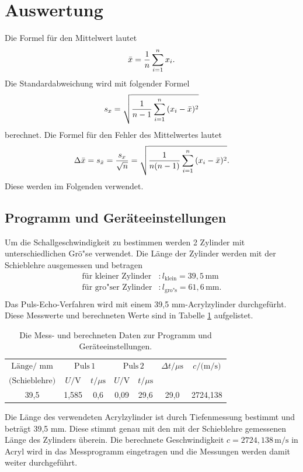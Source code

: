 \section{Auswertung}
\label{sec:Auswertung}
Die Formel für den Mittelwert lautet
 \begin{equation}
    \bar{x}=\frac{1}{n}\sum_{i=1}^n x_i.\\
\end{equation}
Die Standardabweichung wird mit folgender Formel
\begin{equation}
    s_x=\sqrt{\frac{1}{n-1}\sum_{i=1}^n {(x_i-\bar{x})^2 }}\\
\end{equation}
berechnet.
Die Formel für den Fehler des Mittelwertes lautet
\begin{equation}
    \Delta \bar{x} = s_{\bar{x}}=\frac{s_x}{\sqrt{n}}= \sqrt{\frac{1}{n(n-1)}\sum_{i=1}^n {(x_i-\bar{x})^2 }}.\\
\end{equation}
Diese werden im Folgenden verwendet.
\subsection{Programm und Geräteeinstellungen}
Um die Schallgeschwindigkeit zu bestimmen werden 2 Zylinder mit unterschiedlichen Grö"se verwendet. 
Die Länge der Zylinder werden mit der Schieblehre ausgemessen und betragen
\begin{align*}
    \text{für kleiner Zylinder}&: l_{\text{klein}} =39,5\, \text{mm}\\
    \text{für gro"ser Zylinder}&: l_{\text{gro"s}} =61,6\, \text{mm}.\\
   \end{align*}
Das Puls-Echo-Verfahren wird mit einem 39,5 mm-Acrylzylinder durchgefürht.
 Diese Messwerte und berechneten Werte sind in Tabelle \ref{tab:Programm} aufgelistet.

 \begin{table}[H]
    \centering
    \caption{Die Mess- und berechneten Daten zur Programm und Geräteeinstellungen.}
    \label{tab:Programm}
    \begin{tabular}{| c | c |c|c|  c |c|c|}
    \hline
    $\text{Länge/ mm} $ &\multicolumn{2}{c|}{$\text{Puls}\, 1$} & \multicolumn{2}{c|}{$\text{Puls}\, 2$}& $\Delta t/ \mu \text{s}$ &$c/ \text{(m/s)}$\\
    $\text{(Schieblehre)}$& $U/\text{V}$ & $t/ \mu \text{s}$ & $U/\text{V}$ & $t/ \mu \text{s}$ &{}&{}\\
    \hline
    39,5& 1,585& 0,6&0,09&29,6&29,0&2724,138\\
    \hline
\end{tabular}
\end{table}
\noindent
Die Länge des verwendeten Acrylzylinder ist durch Tiefenmessung bestimmt und beträgt 39,5 mm.
 Diese stimmt genau mit den mit der Schieblehre gemessenen Länge des Zylinders überein.
 Die berechnete Geschwindigkeit $c=2724,138 \,\text{m/s} $ in Acryl  wird in das Messprogramm eingetragen und die Messungen werden damit weiter durchgeführt.
